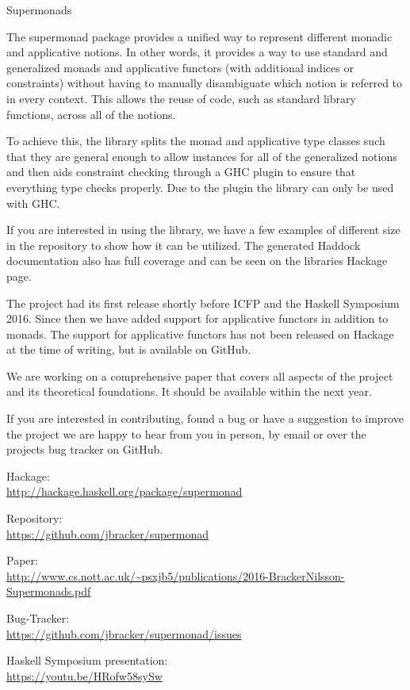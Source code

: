 \begin{hcarentry}[updated]{Supermonads}
\label{supermonads}
\makeheader

The supermonad package provides a unified way to represent different monadic
and applicative notions. In other words, it provides a way to use standard and
generalized monads and applicative functors (with additional indices or
constraints) without having to manually disambiguate which notion is referred
to in every context. This allows the reuse of code, such as standard library
functions, across all of the notions.

To achieve this, the library splits the monad and applicative type classes
such that they are general enough to allow instances for all of the
generalized notions and then aids constraint checking through a GHC plugin to
ensure that everything type checks properly. Due to the plugin the library can
only be used with GHC.

If you are interested in using the library, we have a few examples of
different size in the repository to show how it can be utilized. The generated
Haddock documentation also has full coverage and can be seen on the libraries
Hackage page.

The project had its first release shortly before ICFP and the Haskell
Symposium 2016. Since then we have added support for applicative functors in
addition to monads. The support for applicative functors has not been released
on Hackage at the time of writing, but is available on GitHub.

We are working on a comprehensive paper that covers all aspects of the project
and its theoretical foundations. It should be available within the next year.

If you are interested in contributing, found a bug or have a suggestion to
improve the project we are happy to hear from you in person, by email or over
the projects bug tracker on GitHub.

\FurtherReading
\begin{compactitem}
  \item Hackage:\\ \url{http://hackage.haskell.org/package/supermonad}
  \item Repository:\\ \url{https://github.com/jbracker/supermonad}
  \item Paper:\\
    \url{http://www.cs.nott.ac.uk/~psxjb5/publications/2016-BrackerNilsson-Supermonads.pdf}
  \item Bug-Tracker:\\ \url{https://github.com/jbracker/supermonad/issues}
  \item Haskell Symposium presentation:\\ \url{https://youtu.be/HRofw58sySw}
\end{compactitem}
\end{hcarentry}
